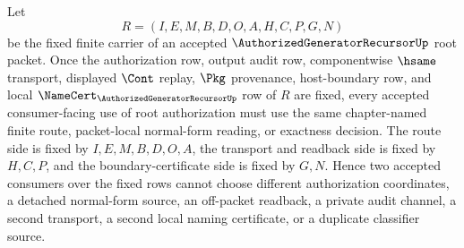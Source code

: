 \begin{corollary}
\label{cor:authorized-generator-recursor-root-authorization-determinacy}
Let
$$
R=(I,E,M,B,D,O,A,H,C,P,G,N)
$$
be the fixed finite carrier of an accepted $\AuthorizedGeneratorRecursorUp$ root packet. Once the authorization row, output audit row, componentwise $\hsame$ transport, displayed $\Cont$ replay, $\Pkg$ provenance, host-boundary row, and local $\NameCert_{\AuthorizedGeneratorRecursorUp}$ row of $R$ are fixed, every accepted consumer-facing use of root authorization must use the same chapter-named finite route, packet-local normal-form reading, or exactness decision. The route side is fixed by $I,E,M,B,D,O,A$, the transport and readback side is fixed by $H,C,P$, and the boundary-certificate side is fixed by $G,N$. Hence two accepted consumers over the fixed rows cannot choose different authorization coordinates, a detached normal-form source, an off-packet readback, a private audit channel, a second transport, a second local naming certificate, or a duplicate classifier source.
\end{corollary}
